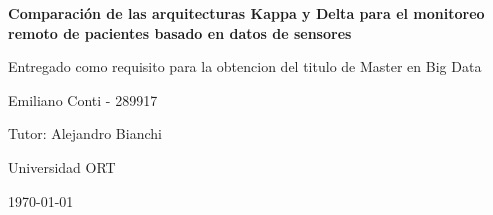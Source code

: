 \begin{titlepage}
    \centering
    {\huge\bfseries Comparación de las arquitecturas Kappa y Delta para el monitoreo remoto de pacientes basado en datos de sensores \par}
    \vspace{2cm}
    {\Large Entregado como requisito para la obtencion del
titulo de Master en Big Data\par}
    \vspace{1cm}
    {\large Emiliano Conti - 289917\par}
    \vspace{1cm}
    {\large Tutor: Alejandro Bianchi \par}
    \vspace{1cm}
    {\small Universidad ORT\par}
    \vspace{1cm}
    {\large \today\par}
\end{titlepage}